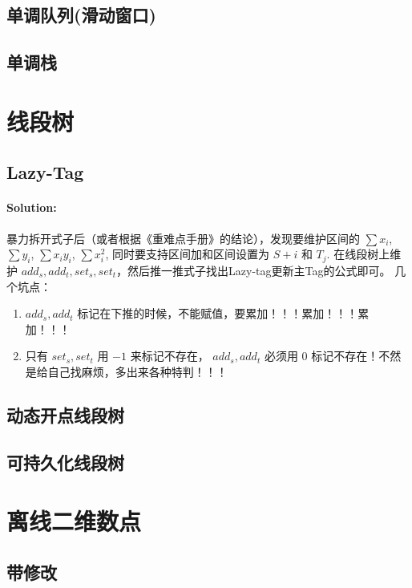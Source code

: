 \documentclass{article}
\begin{document}
		\subsection{单调队列(滑动窗口)}
		
		\subsection{单调栈}

	\newpage

	\section{线段树}
		\subsection{Lazy-Tag} %
			\paragraph{Solution:}
			暴力拆开式子后（或者根据《重难点手册》的结论），发现要维护区间的 $\sum x_i$, $\sum y_i$, $\sum x_i y_i$, $\sum x_i^2$, 同时要支持区间加和区间设置为 $S+i \text{ 和 } T_j$.
			在线段树上维护 $add_s, add_t, set_s, set_t$，然后推一推式子找出Lazy-tag更新主Tag的公式即可。
			几个坑点：
			\begin{enumerate}
				\item $add_s, add_t$ 标记在下推的时候，不能赋值，要累加！！！累加！！！累加！！！
				\item 只有 $set_s, set_t$ 用 $-1$ 来标记不存在， $add_s, add_t$ 必须用 $0$ 标记不存在！不然是给自己找麻烦，多出来各种特判！！！
			\end{enumerate}
			
		\subsection{动态开点线段树}

		\subsection{可持久化线段树}

	\section{离线二维数点}
		\subsection{带修改}
\end{document}
